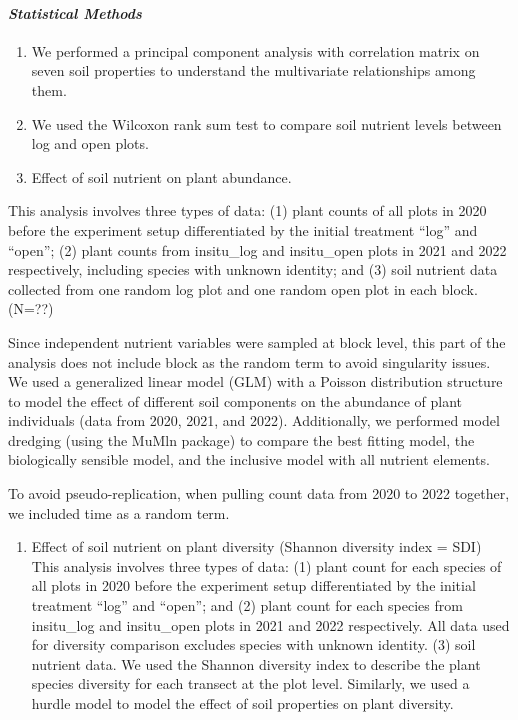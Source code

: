 \documentclass[
]{article}
\providecommand{\tightlist}{%
  \setlength{\itemsep}{0pt}\setlength{\parskip}{0pt}}
\begin{document}
\hypertarget{statistical-methods-1}{%
\paragraph{\texorpdfstring{\emph{Statistical Methods}
}{Statistical Methods  }}\label{statistical-methods-1}}

\begin{enumerate}
\def\labelenumi{\arabic{enumi}.}
\tightlist
\item
  We performed a principal component analysis with correlation matrix on
  seven soil properties to understand the multivariate relationships
  among them.
\item
  We used the Wilcoxon rank sum test to compare soil nutrient levels
  between log and open plots.
\item
  Effect of soil nutrient on plant abundance.
\end{enumerate}

This analysis involves three types of data: (1) plant counts of all
plots in 2020 before the experiment setup differentiated by the initial
treatment ``log'' and ``open''; (2) plant counts from insitu\_log and
insitu\_open plots in 2021 and 2022 respectively, including species with
unknown identity; and (3) soil nutrient data collected from one random
log plot and one random open plot in each block. (N=??)

Since independent nutrient variables were sampled at block level, this
part of the analysis does not include block as the random term to avoid
singularity issues. We used a generalized linear model (GLM) with a
Poisson distribution structure to model the effect of different soil
components on the abundance of plant individuals (data from 2020, 2021,
and 2022). Additionally, we performed model dredging (using the MuMln
package) to compare the best fitting model, the biologically sensible
model, and the inclusive model with all nutrient elements.

To avoid pseudo-replication, when pulling count data from 2020 to 2022
together, we included time as a random term.

\begin{enumerate}
\def\labelenumi{\arabic{enumi}.}
\setcounter{enumi}{3}
\tightlist
\item
  Effect of soil nutrient on plant diversity (Shannon diversity index =
  SDI) This analysis involves three types of data: (1) plant count for
  each species of all plots in 2020 before the experiment setup
  differentiated by the initial treatment ``log'' and ``open''; and (2)
  plant count for each species from insitu\_log and insitu\_open plots
  in 2021 and 2022 respectively. All data used for diversity comparison
  excludes species with unknown identity. (3) soil nutrient data. We
  used the Shannon diversity index to describe the plant species
  diversity for each transect at the plot level. Similarly, we used a
  hurdle model to model the effect of soil properties on plant
  diversity.
\end{enumerate}
\end{document}

